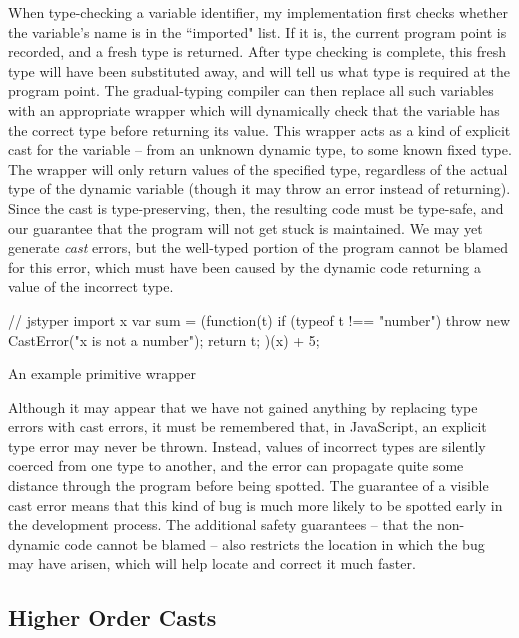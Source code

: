 \documentclass[12pt,a4paper,twoside,openright]{report}
\theoremstyle{definition}
\theoremstyle{dotless}
\begin{document}
When type-checking a variable identifier, my implementation first checks
whether the variable's name is in the ``imported" list. If it is, the current
program point is recorded, and a fresh type is returned. After type checking is
complete, this fresh type will have been substituted away, and will tell us
what type is required at the program point. The gradual-typing compiler can
then replace all such variables with an appropriate wrapper which will
dynamically check that the variable has the correct type before
returning its value.  This wrapper acts as a kind of explicit cast for the
variable -- from an unknown dynamic type, to some known fixed type. The wrapper
will only return values of the specified type, regardless of the actual type of
the dynamic variable (though it may throw an error instead of returning).
Since the cast is type-preserving, then, the resulting code must be type-safe,
and our guarantee that the program will not get stuck is maintained. We may yet
generate \textit{cast} errors,
but the well-typed portion of the program cannot be blamed for this error,
which must have been caused by the dynamic code returning a value of the
incorrect type. 

\begin{listing}
  \begin{jscript}
	// jstyper import x
	var sum = (function(t) {
	  if (typeof t !== "number") 
	  throw new CastError("x is not a number");
	  return t;
	})(x) + 5;
  \end{jscript}
  \caption{An example primitive wrapper}\label{lst:importPrim}
\end{listing}
Although it may appear that we have not gained anything by replacing type
errors with cast errors, it must be remembered that, in JavaScript, an explicit
type error may never be thrown. Instead, values of incorrect types are silently
coerced from one type to another, and the error can propagate quite some
distance through the program before being spotted. The guarantee of a visible
cast error means that this kind of bug is much more likely to be spotted early
in the development process. The additional safety guarantees -- that the
non-dynamic code cannot be blamed -- also restricts the location in which the bug
may have arisen, which will help locate and correct it much faster.

\subsection{Higher Order Casts}
\end{document}
